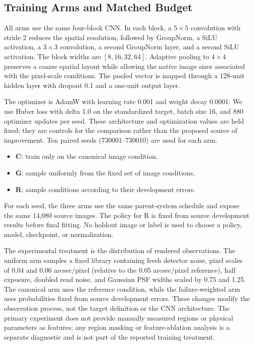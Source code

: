 \documentclass[letterpaper]{article}
\begin{document}
\subsection{Training Arms and Matched Budget}

All arms use the same four-block CNN. In each block, a $5\times5$ convolution
with stride 2 reduces the spatial resolution, followed by GroupNorm, a SiLU
activation, a $3\times3$ convolution, a second GroupNorm layer, and a second
SiLU activation. The block widths are $[8,16,32,64]$. Adaptive pooling to
$4\times4$ preserves a coarse spatial layout while allowing the native image
sizes associated with the pixel-scale conditions. The pooled vector is mapped
through a 128-unit hidden layer with dropout 0.1 and a one-unit output layer.

The optimizer is AdamW with learning rate 0.001 and weight decay 0.0001. We
use Huber loss with delta 1.0 on the standardized target, batch size 16, and
880 optimizer updates per seed. These architecture and optimization values
are held fixed; they are controls for the comparison rather than the proposed
source of improvement. Ten paired seeds (730001--730010) are used for each
arm.

\begin{itemize}
\item \textbf{C}: train only on the canonical image condition.
\item \textbf{G}: sample uniformly from the fixed set of image conditions.
\item \textbf{R}: sample conditions according to their development errors.
\end{itemize}

For each seed, the three arms use the same parent-system schedule and expose
the same 14,080 source images. The policy for R is fixed from source
development results before final fitting. No holdout image or label is used to
choose a policy, model, checkpoint, or normalization.

The experimental treatment is the distribution of rendered observations. The
uniform arm samples a fixed library containing fresh detector noise, pixel
scales of 0.04 and 0.06 arcsec/pixel (relative to the 0.05 arcsec/pixel
reference), half exposure, doubled read noise, and Gaussian PSF widths scaled
by 0.75 and 1.25. The canonical arm uses the reference condition, while the
failure-weighted arm uses probabilities fixed from source development errors.
These changes modify the observation process, not the target definition or the
CNN architecture. The primary experiment does not
provide manually measured regions or physical parameters as features; any
region masking or feature-ablation analysis is a separate diagnostic and is
not part of the reported training treatment.
\end{document}
